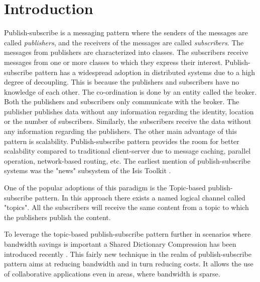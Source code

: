\chapter{Introduction}\label{chapter:introduction}

Publish-subscribe is a messaging pattern where the senders of the messages are called \textit{publishers}, and the receivers of the messages are called \textit{subscribers}. The messages from publishers are characterized into classes. The subscribers receive messages from one or more classes to which they express their interest. Publish-subscribe pattern has a widespread adoption in distributed systems due to a high degree of decoupling. This is because the publishers and subscribers have no knowledge of each other. The co-ordination is done by an entity called the broker. Both the publishers and subscribers only communicate with the broker. The publisher publishes data without any information regarding the identity, location or the number of subscribers. Similarly, the subscribers receive the data without any information regarding the publishers. The other main advantage of this pattern is scalability. Publish-subscribe pattern provides the room for better scalability compared to traditional client-server due to message caching, parallel operation, network-based routing, etc. The earliest mention of publish-subscribe systems was the "news" subsystem of the Isis Toolkit \parencite{Birman:1987:EVS:37499.37515}.

One of the popular adoptions of this paradigm is the Topic-based publish-subscribe pattern. In this approach there exists a named logical channel called "topics". All the subscribers will receive the same content from a topic to which the publishers publish the content.

To leverage the topic-based publish-subscribe pattern further in scenarios where bandwidth savings is important a Shared Dictionary Compression has been introduced recently \parencite{Doblander:2016:SDC}. This fairly new technique in the realm of publish-subscribe pattern aims at reducing bandwidth and in turn reducing costs. It allows the use of collaborative applications even in areas, where bandwidth is sparse.